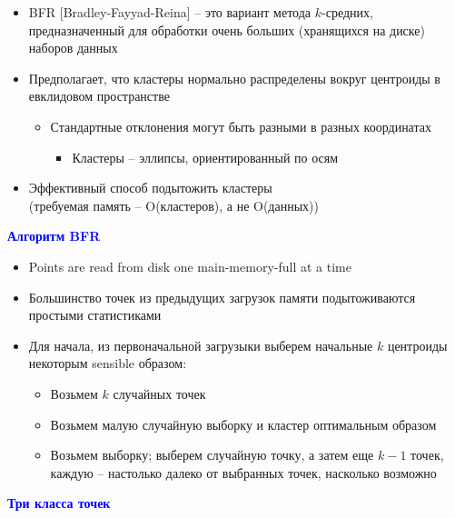 \documentclass[landscape]{slides}
\begin{document}
\begin{normalsize}
\begin{slide}
\begin{itemize}
\item BFR [Bradley-Fayyad-Reina] -- это вариант метода $k$-средних,
предназначенный для обработки очень больших (хранящихся на диске) наборов данных
\item Предполагает, что кластеры нормально распределены вокруг центроиды в евклидовом пространстве
  \begin{itemize}
  \item Стандартные отклонения могут быть разными в разных координатах 
    \begin{itemize}
    \item Кластеры -- эллипсы, ориентированный по осям
    \end{itemize}
  \end{itemize}
\item Эффективный способ подытожить кластеры\\
(требуемая память -- O(кластеров), а не O(данных))
\end{itemize}
\end{slide}



\begin{slide}
\textbf{\textcolor{blue}{Алгоритм BFR}}

\begin{itemize}
\item Points are read from disk one main-memory-full at a time
\item Большинство точек из предыдущих загрузок памяти подытоживаются простыми статистиками
\item Для начала, из первоначальной загрузыки выберем начальные $k$ центроиды некоторым sensible образом:
  \begin{itemize}
  \item Возьмем $k$ случайных точек
  \item Возьмем малую случайную выборку и кластер оптимальным образом
  \item Возьмем выборку; выберем случайную точку, а затем еще $k-1$ точек, каждую -- настолько далеко от выбранных точек, насколько возможно
  \end{itemize}
\end{itemize}
\end{slide}



\begin{slide}
\textbf{\textcolor{blue}{Три класса точек}}


\end{slide}
\end{normalsize}
\end{document}
